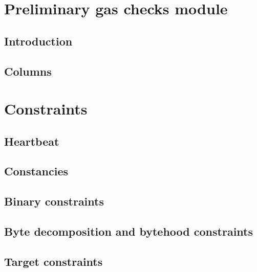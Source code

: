 \def\nByteColumns{10}

\section{Preliminary gas checks module}
	\subsection{Introduction}
		
	\subsection{Columns}
		

\section{Constraints}
	\subsection{Heartbeat}
		\label{sec: (preliminary gas check) heartbeat}
		
	\subsection{Constancies}
		\label{sec: (preliminary gas check) constancies}
		
	\subsection{Binary constraints}
		\label{sec: (preliminary gas check) binary}
		
	\subsection{Byte decomposition and bytehood constraints}
		\label{sec: (preliminary gas check) byteDec}
		
	\subsection{Target constraints}
		\label{sec: (preliminary gas check) target}
		